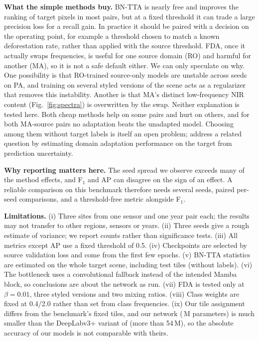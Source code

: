 \documentclass[11pt]{article}
\newcommand{\BNTTA}{BN-TTA}
\newcommand{\Fone}{F$_1$}
\begin{document}
\textbf{What the simple methods buy.}
\BNTTA{} is nearly free and improves the ranking of target pixels in most pairs, but at a fixed threshold it can trade a large precision loss for a recall gain.
In practice it should be paired with a decision on the operating point, for example a threshold chosen to match a known deforestation rate, rather than applied with the source threshold.
FDA, once it actually swaps frequencies, is useful for one source domain (RO) and harmful for another (MA), so it is not a safe default either.
We can only speculate on why.
One possibility is that RO-trained source-only models are unstable across seeds on PA, and training on several styled versions of the scene acts as a regularizer that removes this instability.
Another is that MA's distinct low-frequency NIR content (Fig.~\ref{fig:spectra}) is overwritten by the swap.
Neither explanation is tested here.
Both cheap methods help on some pairs and hurt on others, and for both MA-source pairs no adaptation beats the unadapted model.
Choosing among them without target labels is itself an open problem; \citet{ortega2026domain} address a related question by estimating domain adaptation performance on the target from prediction uncertainty.

\textbf{Why reporting matters here.}
The seed spread we observe exceeds many of the method effects, and \Fone{} and AP can disagree on the sign of an effect.
A reliable comparison on this benchmark therefore needs several seeds, paired per-seed comparisons, and a threshold-free metric alongside \Fone{}.

\textbf{Limitations.}
(i) Three sites from one sensor and one year pair each; the results may not transfer to other regions, sensors or years.
(ii) Three seeds give a rough estimate of variance; we report counts rather than significance tests.
(iii) All metrics except AP use a fixed threshold of 0.5.
(iv) Checkpoints are selected by source validation loss and come from the first few epochs.
(v) \BNTTA{} statistics are estimated on the whole target scene, including test tiles (without labels).
(vi) The bottleneck uses a convolutional fallback instead of the intended Mamba block, so conclusions are about the network as run.
(vii) FDA is tested only at $\beta=0.01$, three styled versions and two mixing ratios.
(viii) Class weights are fixed at 0.4/2.0 rather than set from class frequencies.
(ix) Our tile assignment differs from the benchmark's fixed tiles, and our network (\ParamsM{}\,M parameters) is much smaller than the DeepLabv3+ variant of \citet{demoura2025enhancing} (more than 54\,M), so the absolute accuracy of our models is not comparable with theirs.
\end{document}
